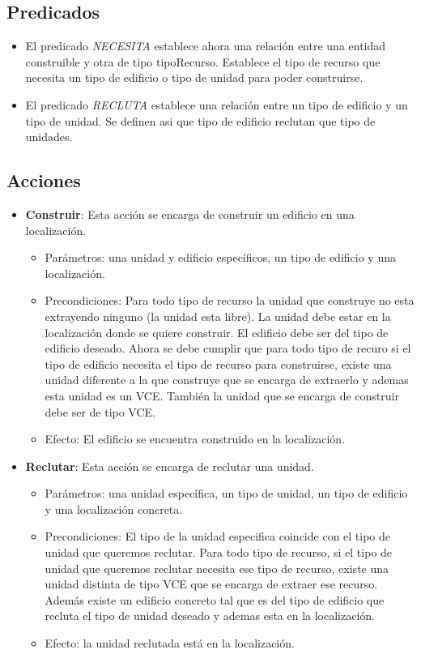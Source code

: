 \subsection{Predicados}
\begin{itemize}
   \item El predicado \textit{NECESITA} establece ahora una relación entre una entidad construible y otra de tipo tipoRecurso. Establece el tipo de recurso que necesita un tipo de edificio o tipo de unidad para poder construirse.
   \item El predicado \textit{RECLUTA} establece una relación entre un tipo de edificio y un tipo de unidad. Se definen asi que tipo de edificio reclutan que tipo de unidades.
\end{itemize}
\subsection{Acciones}
\begin{itemize}
   \item \textbf{Construir}: Esta acción se encarga de construir un edificio en una localización.
   \begin{itemize}
      \item Parámetros: una unidad y edificio específicos, un tipo de edificio y una localización.
      \item Precondiciones: Para todo tipo de recurso la unidad que construye no esta extrayendo ninguno (la unidad esta libre). La unidad debe estar en la localización donde se quiere construir. El edificio debe ser del tipo de edificio deseado. Ahora se debe cumplir que para todo tipo de recuro si el tipo de edificio necesita el tipo de recurso para construirse, existe una unidad diferente a la que construye que se encarga de extraerlo y ademas esta unidad es un VCE. También la unidad que se encarga de construir debe ser de tipo VCE.
      \item Efecto: El edificio se encuentra construido en la localización.
   \end{itemize}
   \item \textbf{Reclutar}: Esta acción se encarga de reclutar una unidad.
   \begin{itemize}
      \item Parámetros: una unidad específica, un tipo de unidad, un tipo de edificio y una localización concreta.
      \item Precondiciones: El tipo de la unidad especifica coincide con el tipo de unidad que queremos reclutar. Para todo tipo de recurso, si el tipo de unidad que queremos reclutar necesita ese tipo de recurso, existe una unidad distinta de tipo VCE que se encarga de extraer ese recurso. Además existe un edificio concreto tal que es del tipo de edificio que recluta el tipo de unidad deseado y ademas esta en la localización.
      \item Efecto: la unidad reclutada está en la localización.
   \end{itemize}
\end{itemize}
